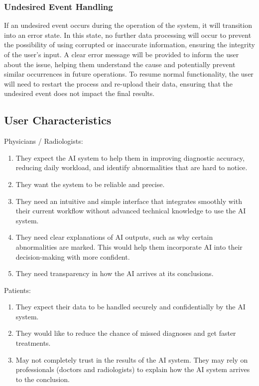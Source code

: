 \documentclass[12pt]{article}
\begin{document}
\subsubsection{Undesired Event Handling}
If an undesired event occurs during the operation of the system, it will transition into an error state. In this state, no further data processing will occur to prevent the possibility of using corrupted or inaccurate information, ensuring the integrity of the user's input. A clear error message will be provided to inform the user about the issue, helping them understand the cause and potentially prevent similar occurrences in future operations. To resume normal functionality, the user will need to restart the process and re-upload their data, ensuring that the undesired event does not impact the final results.

\subsection{User Characteristics} \label{SecUserCharacteristics}
Physicians / Radiologists: 
\begin{enumerate}
 \item They expect the AI system to help them in improving diagnostic accuracy, reducing daily workload, and identify abnormalities that are hard to notice.
 \item They want the system to be reliable and precise.
 \item They need an intuitive and simple interface that integrates smoothly with their current workflow without advanced technical knowledge to use the AI system.
 \item They need clear explanations of AI outputs, such as why certain abnormalities are marked. This would help them incorporate AI into their decision-making with more confident.
 \item They need transparency in how the AI arrives at its conclusions.
 \end{enumerate}
 Patients:
 \begin{enumerate}
 \item They expect their data to be handled securely and confidentially by the AI system.
 \item They would like to reduce the chance of missed diagnoses and get faster treatments.
 \item May not completely trust in the results of the AI system. They may rely on professionals (doctors and radiologists) to explain how the AI system arrives to the conclusion.
 \end{enumerate}
\end{document}
